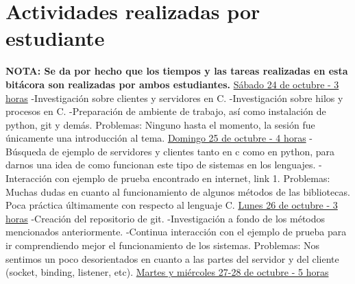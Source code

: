 \documentclass{report}
\begin{document}
\section{Actividades realizadas por estudiante}
\newline
\textbf{NOTA: Se da por hecho que los tiempos y las tareas realizadas en esta bitácora son realizadas por ambos estudiantes.}
\newline\newline
{\underline {Sábado 24 de octubre - 3 horas}
\newline
-Investigación sobre clientes y servidores en C. \newline
-Investigación sobre hilos y procesos en C.\newline
-Preparación de ambiente de trabajo, así como instalación de python, git y demás.\newline
\newline
Problemas: Ninguno hasta el momento, la sesión fue únicamente una introducción al tema.
\newline
\newline
{\underline {Domingo 25 de octubre - 4 horas}}
\newline
-Búsqueda de ejemplo de servidores y clientes tanto en c como en python, para darnos una idea de como funcionan este tipo de sistemas en los lenguajes. \newline
-Interacción con ejemplo de prueba encontrado en internet, link 1.\newline
\newline
Problemas: Muchas dudas en cuanto al funcionamiento de algunos métodos de las bibliotecas. Poca práctica últimamente con respecto al lenguaje C.
\newline
\newline
{\underline {Lunes 26 de octubre - 3 horas}
\newline
-Creación del repositorio de git. \newline
-Investigación a fondo de los métodos mencionados anteriormente.\newline
-Continua interacción con el ejemplo de prueba para ir comprendiendo mejor el funcionamiento de los sistemas.\newline
\newline
Problemas: Nos sentimos un poco desorientados en cuanto a las partes del servidor y del cliente (socket, binding, listener, etc).
\newline
\newline
{\underline {Martes y miércoles 27-28 de octubre - 5 horas}
}}}
\end{document}
